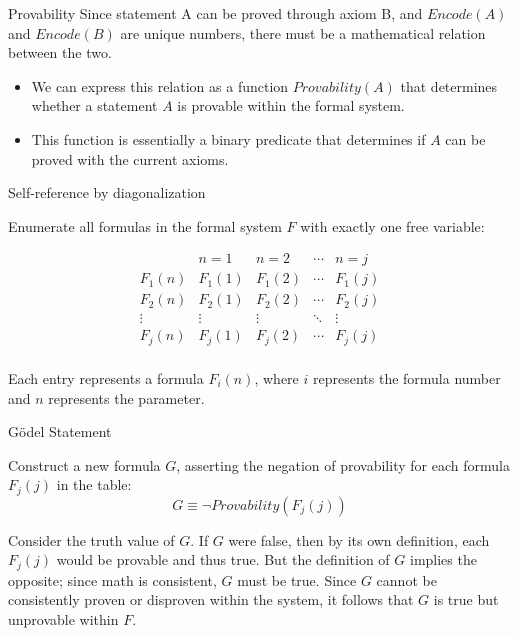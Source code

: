 \documentclass[final]{beamer} %
\newlength{\colwidth}
\begin{document}
\begin{frame}[t]
\begin{columns}[t]
\begin{column}{\colwidth}
\begin{block}{Provability}
Since statement A can be proved through axiom B, and $Encode(A)$ and $Encode(B)$ are unique numbers, there must be a mathematical relation between the two.

 \begin{itemize}
    
    \item We can express this relation as a function $Provability(A)$ that determines whether a statement $A$ is provable within the formal system.
    
    \item This function is essentially a binary predicate that determines if $A$ can be proved with the current axioms.
    
    \end{itemize}

 \end{block}


 \begin{block}{Self-reference by diagonalization}

    Enumerate all formulas in the formal system $F$ with exactly one free variable:
    
    \[
    \begin{array}{c|c|c|c|c}
    & n=1 & n=2 & \cdots & n = j \\
    \hline
    F_1(n) & F_1(1) & F_1(2) & \cdots & F_1(j) \\
    F_2(n) & F_2(1) & F_2(2) & \cdots & F_2(j) \\
    \vdots & \vdots & \vdots & \ddots & \vdots \\
    F_j(n) & F_j(1) & F_j(2) & \cdots & F_j(j) \\
    \end{array}
    \]


Each entry represents a formula \( F_i(n) \), where \( i \) represents the formula number and \( n \) represents the parameter.
\end{block}

\begin{block}{Gödel Statement}

Construct a new formula $G$, asserting the negation of provability for each formula $F_j(j)$ in the table:
$$G \equiv \neg Provability(F_j(j))$$

Consider the truth value of $G$. If $G$ were false, then by its own definition, each $F_j(j)$ would be provable and thus true. But the definition of $G$ implies the opposite; since math is consistent, $G$ must be true. Since $G$ cannot be consistently proven or disproven within the system, it follows that $G$ is true but unprovable within $F$.
 

\end{block}
\end{column}
\end{columns}
\end{frame}
\end{document}
